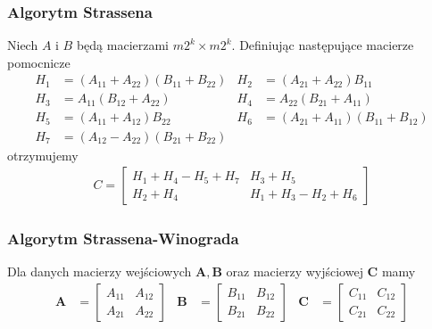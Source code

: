 
\subsubsection{Algorytm Strassena}
Niech \(A\) i \(B\) będą macierzami \(m2^k\times m2^k\). Definiując następujące macierze pomocnicze
\begin{align*}
H_1 &= (A_{11}+A_{22})(B_{11}+B_{22})&
 H_2 &= (A_{21}+A_{22})B_{11}\\
H_3 &= A_{11}(B_{12} + A_{22})&
 H_4 &= A_{22}(B_{21} + A_{11})\\
H_5 &= (A_{11}+A_{12})B_{22}&
 H_6 &= (A_{21} + A_{11})(B_{11} + B_{12}) \\
H_7 &= (A_{12}-A_{22})(B_{21}+B_{22}) 
\end{align*}
otrzymujemy
\begin{align}
C = \begin{bmatrix}
H_1+H_4-H_5+H_7& H_3+H_5\\
H_2+H_4& H_1+H_3-H_2+H_6
\end{bmatrix}
\end{align}

\subsubsection{Algorytm Strassena-Winograda}
Dla danych macierzy wejściowych \(\mathbf{A}, \mathbf{B}\) oraz macierzy wyjściowej \(\mathbf{C}\) mamy
\begin{align*}
\mathbf{A}& = \begin{bmatrix} A_{11}& A_{12} \\ A_{21}& A_{22} \end{bmatrix}&
\mathbf{B}& = \begin{bmatrix} B_{11}& B_{12} \\ B_{21}& B_{22} \end{bmatrix}&
\mathbf{C}& = \begin{bmatrix} C_{11}& C_{12} \\ C_{21}& C_{22} \end{bmatrix}
\end{align*}


